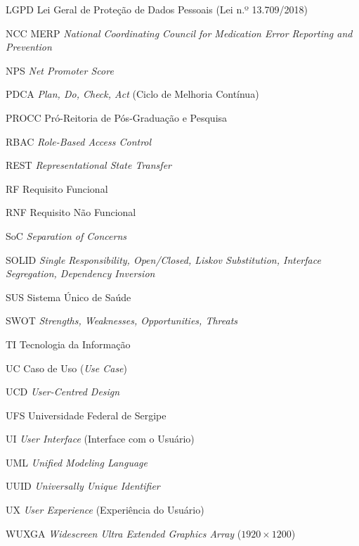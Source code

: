 \begin{siglas}
    \item[LGPD] Lei Geral de Proteção de Dados Pessoais (Lei n.º 13.709/2018)
    \item[NCC MERP] \textit{National Coordinating Council for Medication Error Reporting and Prevention}
    \item[NPS] \textit{Net Promoter Score}
    \item[PDCA] \textit{Plan, Do, Check, Act} (Ciclo de Melhoria Contínua)
    \item[PROCC] Pró-Reitoria de Pós-Graduação e Pesquisa
    \item[RBAC] \textit{Role-Based Access Control}
    \item[REST] \textit{Representational State Transfer}
    \item[RF] Requisito Funcional
    \item[RNF] Requisito Não Funcional
    \item[SoC] \textit{Separation of Concerns}
    \item[SOLID] \textit{Single Responsibility, Open/Closed, Liskov Substitution, Interface Segregation, Dependency Inversion}
    \item[SUS] Sistema Único de Saúde
    \item[SWOT] \textit{Strengths, Weaknesses, Opportunities, Threats}
    \item[TI] Tecnologia da Informação
    \item[UC] Caso de Uso (\textit{Use Case})
    \item[UCD] \textit{User-Centred Design}
    \item[UFS] Universidade Federal de Sergipe
    \item[UI] \textit{User Interface} (Interface com o Usuário)
    \item[UML] \textit{Unified Modeling Language}
    \item[UUID] \textit{Universally Unique Identifier}
    \item[UX] \textit{User Experience} (Experiência do Usuário)
    \item[WUXGA] \textit{Widescreen Ultra Extended Graphics Array} ($1920 \times 1200$)
\end{siglas}
